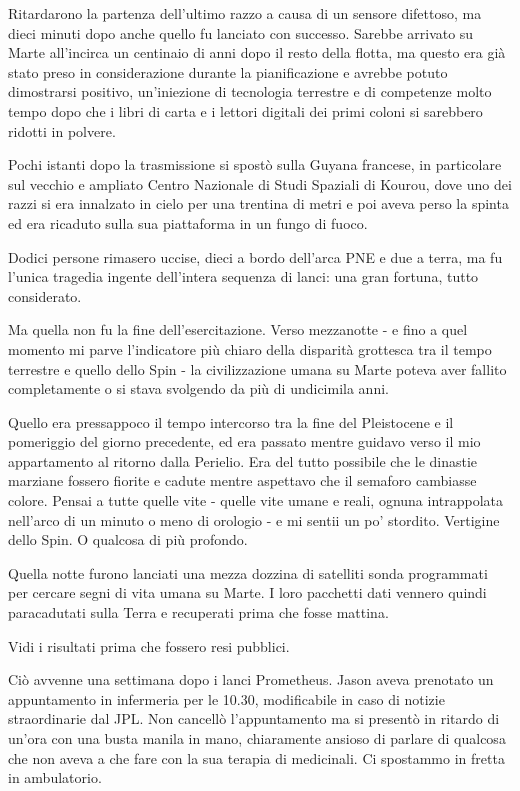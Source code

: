 Ritardarono la partenza dell'ultimo razzo a causa di un sensore
difettoso, ma dieci minuti dopo anche quello fu lanciato con successo.
Sarebbe arrivato su Marte all'incirca un centinaio di anni dopo il resto
della flotta, ma questo era già stato preso in considerazione durante la
pianificazione e avrebbe potuto dimostrarsi positivo, un'iniezione di
tecnologia terrestre e di competenze molto tempo dopo che i libri di
carta e i lettori digitali dei primi coloni si sarebbero ridotti in
polvere.

\separatorefiori

Pochi istanti dopo la trasmissione si spostò sulla Guyana francese, in
particolare sul vecchio e ampliato Centro Nazionale di Studi Spaziali di
Kourou, dove uno dei razzi si era innalzato in cielo per una trentina di
metri e poi aveva perso la spinta ed era ricaduto sulla sua piattaforma
in un fungo di fuoco.

Dodici persone rimasero uccise, dieci a bordo dell'arca PNE e due a
terra, ma fu l'unica tragedia ingente dell'intera sequenza di lanci: una
gran fortuna, tutto considerato.

\separatorefiori

Ma quella non fu la fine dell'esercitazione. Verso mezzanotte - e fino a
quel momento mi parve l'indicatore più chiaro della disparità grottesca
tra il tempo terrestre e quello dello Spin - la civilizzazione umana su
Marte poteva aver fallito completamente o si stava svolgendo da più di
undicimila anni.

Quello era pressappoco il tempo intercorso tra la fine del Pleistocene e
il pomeriggio del giorno precedente, ed era passato mentre guidavo verso
il mio appartamento al ritorno dalla Perielio. Era del tutto possibile
che le dinastie marziane fossero fiorite e cadute mentre aspettavo che
il semaforo cambiasse colore. Pensai a tutte quelle vite - quelle vite
umane e reali, ognuna intrappolata nell'arco di un minuto o meno di
orologio - e mi sentii un po' stordito. Vertigine dello Spin. O qualcosa
di più profondo.

Quella notte furono lanciati una mezza dozzina di satelliti sonda
programmati per cercare segni di vita umana su Marte. I loro pacchetti
dati vennero quindi paracadutati sulla Terra e recuperati prima che
fosse mattina.

\separatorefiori

Vidi i risultati prima che fossero resi pubblici.

Ciò avvenne una settimana dopo i lanci Prometheus. Jason aveva prenotato
un appuntamento in infermeria per le 10.30, modificabile in caso di
notizie straordinarie dal JPL. Non cancellò l'appuntamento ma si
presentò in ritardo di un'ora con una busta manila in mano, chiaramente
ansioso di parlare di qualcosa che non aveva a che fare con la sua
terapia di medicinali. Ci spostammo in fretta in ambulatorio.

